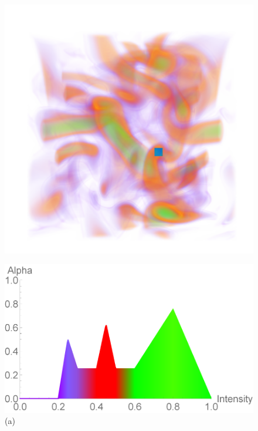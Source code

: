 \documentclass[twoside,twocolumn,10pt]{article}
\begin{document}
\begin{figure}
\begin{minipage}{.14\textwidth}
		\label{fig:vortex_2_blue}
	\end{minipage}~
	\begin{minipage}{.14\textwidth}
		\centering
		\includegraphics[width=1\linewidth]{vortex_yellow_crop}
		\label{fig:vortex_2_yellow}
	\end{minipage}
	\begin{minipage}{.16\textwidth}
		\centering
		\includegraphics[width=.91\linewidth]{tf_vortex}
		(a)%
		\label{fig:tf_vortex}
	\end{minipage}~

\end{figure}
\end{document}
